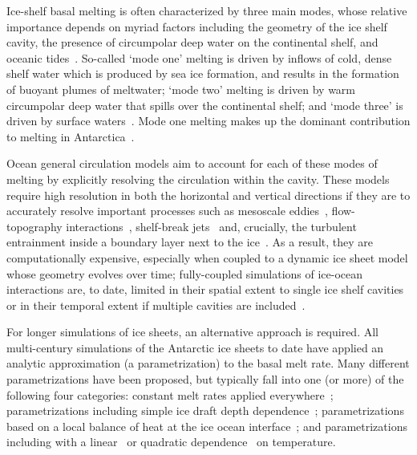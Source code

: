 \documentclass{jfm}
\begin{document}
Ice-shelf basal melting is often characterized by three main modes, whose relative importance depends on myriad factors including the geometry of the ice shelf cavity, the presence of circumpolar deep water on the continental shelf, and oceanic tides~\citep{Jacobs1992JGlac}. So-called `mode one' melting is driven by inflows of cold, dense shelf water which is produced by sea ice formation, and results in the formation of buoyant plumes of meltwater; `mode two' melting is driven by warm circumpolar deep water that spills over the continental shelf; and `mode three' is driven by surface waters~\citep{Silvano2016Oceanography}. Mode one melting makes up the dominant contribution to melting in Antarctica~\citep{Adusumilli2020NatureGeo}.

Ocean general circulation models aim to account for each of these modes of melting by explicitly resolving the circulation within the cavity. These models require high resolution in both the horizontal and vertical directions if they are to accurately resolve important processes such as mesoscale eddies~\citep{Stewart2015GRL}, flow-topography interactions~\citep{Nakayama2014OceanModelling}, shelf-break jets~\citep{Graham2016JGeophysResOceans} and, crucially, the turbulent entrainment inside a boundary layer next to the ice~\citep{Kimura2014JPhysOcean, Xu2012AnnGlac}. As a result, they are computationally expensive, especially when coupled to a dynamic ice sheet model whose geometry evolves over time; fully-coupled simulations of ice-ocean interactions are, to date, limited in their spatial extent to single ice shelf cavities~\citep[e.g.][]{DeRydt2016JGeophysResEarthSurf, Seroussi2017GRL} or in their temporal extent if multiple cavities are included~\citep[e.g.][]{Mathiot2017GeosciModDev,Naughten2018JClim}.

For longer simulations of ice sheets, an alternative approach is required. All multi-century simulations of the Antarctic ice sheets to date have applied an analytic approximation (a parametrization) to the basal melt rate. Many different parametrizations have been proposed, but typically fall into one (or more) of the following four categories: constant melt rates applied everywhere~\citep[e.g.][]{Arthern2017GRL}; parametrizations including simple ice draft depth dependence~\citep[e.g.][]{Joughin2014Science}; parametrizations based on a local balance of heat at the ice ocean interface~\citep[e.g][]{Golledge2015Nature}; and parametrizations including with a linear~\citep[e.g.][]{Favier2016Cryo} or quadratic dependence~\citep[e.g.][]{Holland2008JClimate,DeConto2016Nature} on temperature.
\end{document}
